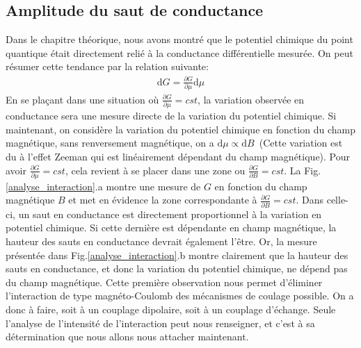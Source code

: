 \subsection{Amplitude du saut de conductance}
Dans le chapitre théorique, nous avons montré que le potentiel chimique du point quantique était directement relié à la conductance différentielle mesurée. On peut résumer cette tendance par la relation suivante:
\begin{eqnarray}
\text{d}G = \frac{\partial G}{\partial \mu} \text{d} \mu
\end{eqnarray}
En se plaçant dans une situation où $\frac{\partial G}{\partial \mu} = cst$, la variation observée en conductance sera une mesure directe de la variation du potentiel chimique. Si maintenant, on considère la variation du potentiel chimique en fonction du champ magnétique, sans renversement magnétique, on a $\text{d}\mu \propto \text{d}B$~(Cette variation est du à l'effet Zeeman qui est linéairement dépendant du champ magnétique). Pour avoir $\frac{\partial G}{\partial \mu} = cst$, cela revient à se placer dans une zone ou $\frac{\partial G}{\partial B} = cst$. La Fig.\ref{analyse_interaction}.a montre une mesure de $G$ en fonction du champ magnétique $B$ et met en évidence la zone correspondante à $\frac{\partial G}{\partial B} = cst$. Dans celle-ci, un saut en conductance est directement proportionnel à la variation en potentiel chimique. Si cette dernière est dépendante en champ magnétique, la hauteur des sauts en conductance devrait également l’être. Or, la mesure présentée dans Fig.\ref{analyse_interaction}.b montre clairement que la hauteur des sauts en conductance, et donc la variation du potentiel chimique, ne dépend pas du champ magnétique. Cette première observation nous permet d'éliminer l'interaction de type magnéto-Coulomb des mécanismes de coulage possible. On a donc à faire, soit à un couplage dipolaire, soit à un couplage d'échange. Seule l'analyse de l'intensité de l'interaction peut nous renseigner, et c'est à sa détermination que nous allons nous attacher maintenant.

